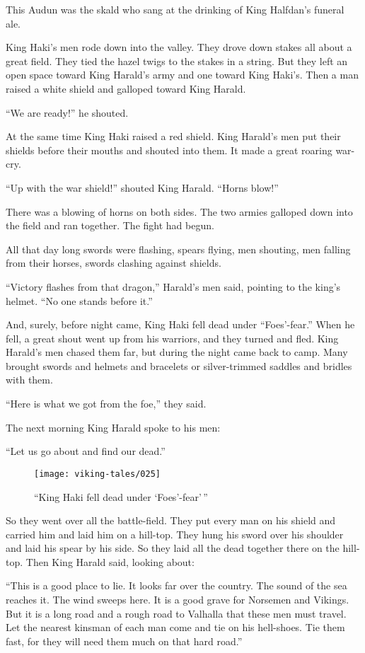 This Audun was the skald who sang at the drinking of King Halfdan's
funeral ale.

King Haki's men rode down into the valley. They drove down stakes all
about a great field. They tied the hazel twigs to the stakes in a
string. But they left an open space toward King Harald's army and one
toward King Haki's. Then a man raised a white shield and galloped toward
King Harald.

``We are ready!'' he shouted.

At the same time King Haki raised a red shield. King Harald's men put
their shields before their mouths and shouted into them. It made a great
roaring war-cry.

``Up with the war shield!'' shouted King Harald. ``Horns blow!''

There was a blowing of horns on both sides. The two armies galloped down
into the field and ran together. The fight had begun.

All that day long swords were flashing, spears flying, men shouting, men
falling from their horses, swords clashing against shields.

``Victory flashes from that dragon,'' Harald's men said, pointing to the
king's helmet. ``No one stands before it.''

And, surely, before night came, King Haki fell dead under
``Foes'-fear.'' When he fell, a great shout went up from his warriors,
and they turned and fled. King Harald's men chased them far, but during
the night came back to camp. Many brought swords and helmets and
bracelets or silver-trimmed saddles and bridles with them.

``Here is what we got from the foe,'' they said.

The next morning King Harald spoke to his men:

``Let us go about and find our dead.''

\begin{figure}[ht]
    \centering
    \texttt{[image: viking-tales/025]}
    \caption{``King Haki fell dead under `Foes'-fear'\,''}
\end{figure}

So they went over all the battle-field. They put every man on his shield
and carried him and laid him on a hill-top. They hung his sword over his
shoulder and laid his spear by his side. So they laid all the dead
together there on the hill-top. Then King Harald said, looking about:

``This is a good place to lie. It looks far over the country. The sound
of the sea reaches it. The wind sweeps here. It is a good grave for
Norsemen and Vikings. But it is a long road and a rough road to Valhalla
that these men must travel. Let the nearest kinsman of each man come and
tie on his hell-shoes. Tie them fast, for they will need them much on
that hard road.''

